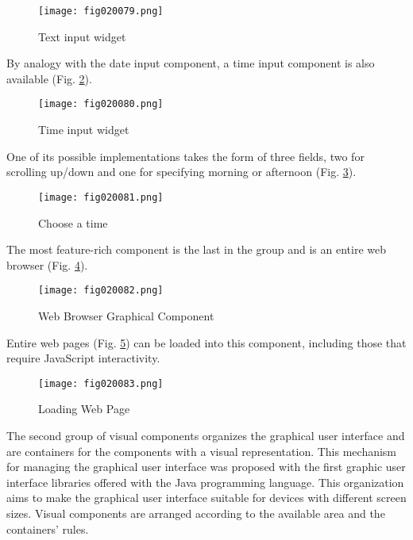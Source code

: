 \begin{figure}[H]
   \centering
   \texttt{[image: fig020079.png]}
   \caption{Text input widget}
\label{fig020079}
\end{figure}

By analogy with the date input component, a time input component is also available (Fig. \ref{fig020080}).

\begin{figure}[H]
   \centering
   \texttt{[image: fig020080.png]}
   \caption{Time input widget}
\label{fig020080}
\end{figure}

One of its possible implementations takes the form of three fields, two for scrolling up/down and one for specifying morning or afternoon (Fig. \ref{fig020081}).

\begin{figure}[H]
   \centering
   \texttt{[image: fig020081.png]}
   \caption{Choose a time}
\label{fig020081}
\end{figure}

The most feature-rich component is the last in the group and is an entire web browser (Fig. \ref{fig020082}).

\begin{figure}[H]
   \centering
   \texttt{[image: fig020082.png]}
   \caption{Web Browser Graphical Component}
\label{fig020082}
\end{figure}

Entire web pages (Fig. \ref{fig020083}) can be loaded into this component, including those that require JavaScript interactivity.

\begin{figure}[H]
   \centering
   \texttt{[image: fig020083.png]}
   \caption{Loading Web Page}
\label{fig020083}
\end{figure}

The second group of visual components organizes the graphical user interface and are containers for the components with a visual representation. This mechanism for managing the graphical user interface was proposed with the first graphic user interface libraries offered with the Java programming language. This organization aims to make the graphical user interface suitable for devices with different screen sizes. Visual components are arranged according to the available area and the containers' rules.

